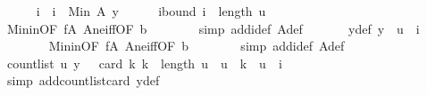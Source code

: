 \begin{isabellebody}
\ \ \ \ \isamarkupfalse%
\ i\ \ {\isachardoublequoteopen}i\ {\isacharequal}{\kern0pt}\ Min\ {\isacharparenleft}{\kern0pt}A\ y{\isacharparenright}{\kern0pt}{\isachardoublequoteclose}\isanewline
\ \ \ \ \isamarkupfalse%
\ i{\isacharunderscore}{\kern0pt}bound{\isacharcolon}{\kern0pt}\ {\isachardoublequoteopen}i\ {\isacharless}{\kern0pt}\ length\ u{\isachardoublequoteclose}\ \isanewline
\ \ \ \ \ \ \isamarkupfalse%
\ Min{\isacharunderscore}{\kern0pt}in{\isacharbrackleft}{\kern0pt}OF\ f{\isacharunderscore}{\kern0pt}A\ A{\isacharunderscore}{\kern0pt}ne{\isacharunderscore}{\kern0pt}iff{\isacharbrackleft}{\kern0pt}OF\ b{\isacharunderscore}{\kern0pt}{}{\isacharbrackright}{\kern0pt}{\isacharbrackright}{\kern0pt}\isanewline
\ \ \ \ \ \ \isamarkupfalse%
\ {\isacharparenleft}{\kern0pt}simp\ add{\isacharcolon}{\kern0pt}i{\isacharunderscore}{\kern0pt}def\ A{\isacharunderscore}{\kern0pt}def{\isacharparenright}{\kern0pt}\ \isanewline
\ \ \ \ \isamarkupfalse%
\ y{\isacharunderscore}{\kern0pt}def{\isacharcolon}{\kern0pt}\ {\isachardoublequoteopen}y\ {\isacharequal}{\kern0pt}\ u\ {\isacharbang}{\kern0pt}\ i{\isachardoublequoteclose}\isanewline
\ \ \ \ \ \ \isamarkupfalse%
\ Min{\isacharunderscore}{\kern0pt}in{\isacharbrackleft}{\kern0pt}OF\ f{\isacharunderscore}{\kern0pt}A\ A{\isacharunderscore}{\kern0pt}ne{\isacharunderscore}{\kern0pt}iff{\isacharbrackleft}{\kern0pt}OF\ b{\isacharunderscore}{\kern0pt}{}{\isacharbrackright}{\kern0pt}{\isacharbrackright}{\kern0pt}\isanewline
\ \ \ \ \ \ \isamarkupfalse%
\ {\isacharparenleft}{\kern0pt}simp\ add{\isacharcolon}{\kern0pt}i{\isacharunderscore}{\kern0pt}def\ A{\isacharunderscore}{\kern0pt}def{\isacharparenright}{\kern0pt}\ \isanewline
\isanewline
\ \ \ \ \isamarkupfalse%
\ {\isachardoublequoteopen}count{\isacharunderscore}{\kern0pt}list\ u\ y\ {\isacharequal}{\kern0pt}\ \ card\ {\isacharbraceleft}{\kern0pt}k{\isachardot}{\kern0pt}\ k\ {\isacharless}{\kern0pt}\ length\ u\ {\isasymand}\ u\ {\isacharbang}{\kern0pt}\ k\ {\isacharequal}{\kern0pt}\ u\ {\isacharbang}{\kern0pt}\ i{\isacharbraceright}{\kern0pt}{\isachardoublequoteclose}\isanewline
\ \ \ \ \ \ \isamarkupfalse%
\ {\isacharparenleft}{\kern0pt}simp\ add{\isacharcolon}{\kern0pt}count{\isacharunderscore}{\kern0pt}list{\isacharunderscore}{\kern0pt}card\ y{\isacharunderscore}{\kern0pt}def{\isacharparenright}{\kern0pt}\isanewline
\ \ \ \ \isamarkupfalse%
\ \isamarkupfalse%

\end{isabellebody}
